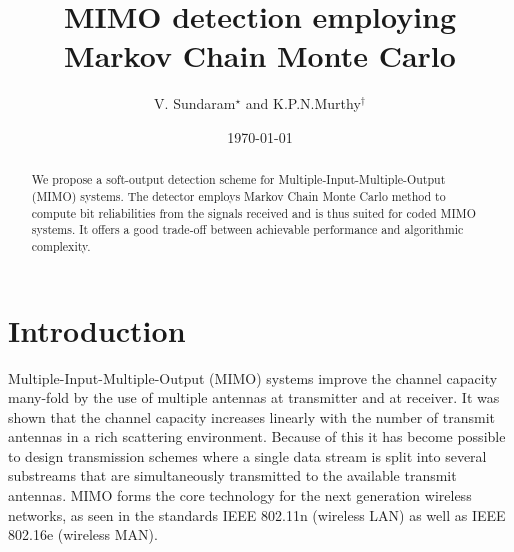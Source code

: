 \documentclass[pre,12pt,aps]{revtex4}
\begin{document}
\title{MIMO detection employing Markov Chain Monte Carlo}
\author{ V. Sundaram${}^{\star}$ and K.P.N.Murthy${}^{\dagger}$}
            
\date{\today}
\begin{abstract}
We propose a soft-output detection scheme for 
Multiple-Input-Multiple-Output (MIMO) systems. 
The detector employs Markov Chain Monte Carlo  method to compute 
bit reliabilities from the signals received 
and is thus suited for coded MIMO systems. 
It offers a good trade-off between achievable performance 
and algorithmic complexity.
\end{abstract}
\maketitle
\section{Introduction}
Multiple-Input-Multiple-Output (MIMO) systems improve 
the channel capacity many-fold by the use of multiple 
antennas at transmitter and at receiver\cite{gjf,vtnsarc}. 
It was shown \cite{gjf} that the channel capacity 
increases linearly with the number of transmit antennas 
in a rich scattering environment. Because of this 
it has become possible to 
design transmission schemes where 
a single data stream is split into several substreams 
that are simultaneously transmitted to the available 
transmit antennas. MIMO forms the core technology for 
the next generation wireless networks, as seen in 
the standards IEEE 802.11n (wireless LAN) 
as well as IEEE 802.16e (wireless MAN).
\end{document}

